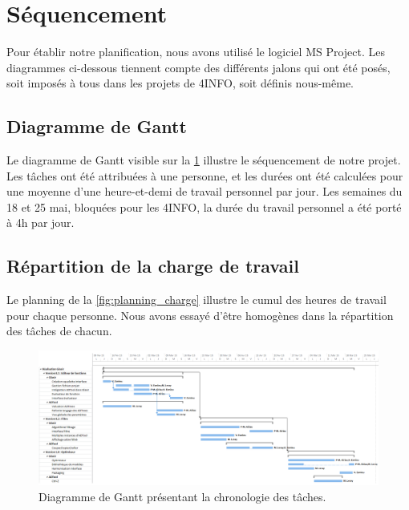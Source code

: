 \section{Séquencement}
	\label{sec:sequencement}
	Pour établir notre planification, nous avons utilisé le logiciel MS Project. Les diagrammes ci-dessous tiennent compte des différents jalons qui ont été posés, soit imposés à tous dans les projets de 4INFO, soit définis nous-même.

	\subsection{Diagramme de Gantt}
		Le diagramme de Gantt visible sur la \ffigure{} \ref{fig:gantt} illustre le séquencement de notre projet. Les tâches ont été attribuées à une personne, et les durées ont été calculées pour une moyenne d'une heure-et-demi de travail personnel par jour. Les semaines du 18 et 25 mai, bloquées pour les 4INFO, la durée du travail personnel a été porté à 4h par jour. 

	\subsection{Répartition de la charge de travail}
		Le planning de la \ffigure{} \ref{fig:planning_charge} illustre le cumul des heures de travail pour chaque personne. Nous avons essayé d'être homogènes dans la répartition des tâches de chacun.

		\begin{landscape}
		 	\begin{figure}
	            \centering
	            \includegraphics[height=0.70\textwidth]{figure/DiagGantt.png}
	            \caption{Diagramme de Gantt présentant la chronologie des tâches.}
	            \label{fig:gantt}
	        \end{figure}
	    \end{landscape}

